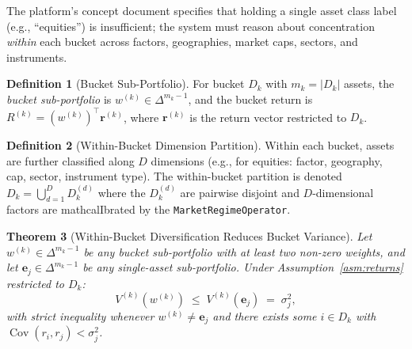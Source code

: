 \documentclass[12pt,openany]{book}
\newcommand{\bfw}{\mathbf{w}}
\newcommand{\bfe}{\mathbf{e}}
\newcommand{\calD}{\mathcal{D}}
\DeclareMathOperator{\Cov}{Cov}
\numberwithin{equation}{chapter}
\theoremstyle{plain}
\newtheorem{theorem}{Theorem}[chapter]
\theoremstyle{definition}
\newtheorem{definition}[theorem]{Definition}
\theoremstyle{remark}
\def\calD{D}%
\def\mathcal#1{#1}%
\def\bfw{w}%
\begin{document}
The platform's concept document specifies that holding a single
asset class label (e.g., ``equities'') is insufficient; the system
must reason about concentration \emph{within} each bucket across
factors, geographies, market caps, sectors, and instruments.

\begin{definition}[Bucket Sub-Portfolio]
\label{def:bucket-sub}
For bucket $\calD_k$ with $m_k = |\calD_k|$ assets, the
\emph{bucket sub-portfolio} is $\bfw^{(k)} \in \Delta^{m_k - 1}$,
and the bucket return is
$R^{(k)} = (\bfw^{(k)})^\top \mathbf{r}^{(k)}$,
where $\mathbf{r}^{(k)}$ is the return vector restricted to $\calD_k$.
\end{definition}

\begin{definition}[Within-Bucket Dimension Partition]
\label{def:within-bucket-partition}
Within each bucket, assets are further classified along $D$ dimensions
(e.g., for equities: factor, geography, cap, sector, instrument type).
The within-bucket partition is denoted
$\calD_k = \bigcup_{d=1}^D \calD_k^{(d)}$ where the $\calD_k^{(d)}$
are pairwise disjoint and $D$-dimensional factors are mathcal{I}brated by
the \texttt{MarketRegimeOperator}.
\end{definition}

\begin{theorem}[Within-Bucket Diversification Reduces Bucket Variance]
\label{thm:within-bucket}
Let $\bfw^{(k)} \in \Delta^{m_k - 1}$ be any bucket sub-portfolio
with at least two non-zero weights, and let
$\bfe_j \in \Delta^{m_k - 1}$ be any single-asset sub-portfolio.
Under Assumption~\ref{asm:returns} restricted to $\calD_k$:
\begin{equation}
  V^{(k)}(\bfw^{(k)})
  \;\leq\;
  V^{(k)}(\bfe_j)
  \;=\;
  \sigma_j^2,
  \label{eq:within-bucket}
\end{equation}
with strict inequality whenever $\bfw^{(k)} \neq \bfe_j$ and
there exists some $i \in \calD_k$ with $\Cov(r_i, r_j) < \sigma_j^2$.
\end{theorem}
\end{document}
